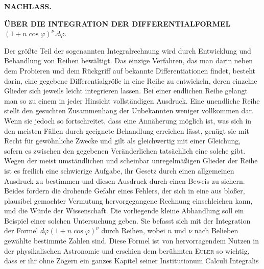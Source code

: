 
\begin{center}
\textbf{NACHLASS.}
\end{center}

\begin{center}
\textbf{ÜBER DIE INTEGRATION DER DIFFERENTIALFORMEL}\\
$(1+n\cos\varphi)^{\nu}. d\varphi.$
\end{center}

\noindent\hspace*{\parindent} Der größte Teil der sogenannten Integralrechnung wird durch Entwicklung und Behandlung von Reihen bewältigt. Das einzige Verfahren, das man darin neben dem Probieren und dem Rückgriff auf bekannte Differentiationen findet, besteht darin, eine gegebene Differentialgröße in eine Reihe zu entwickeln, deren einzelne Glieder sich jeweils leicht integrieren lassen. Bei einer endlichen Reihe gelangt man so zu einem in jeder Hinsicht vollständigen Ausdruck. Eine unendliche Reihe stellt den gesuchten Zusammenhang der Unbekannten weniger vollkommen dar. Wenn sie jedoch so fortschreitet, dass eine Annäherung möglich ist, was sich in den meisten Fällen durch geeignete Behandlung erreichen lässt, genügt sie mit Recht für gewöhnliche Zwecke und gilt als gleichwertig mit einer Gleichung, sofern es zwischen den gegebenen Veränderlichen tatsächlich eine solche gibt. Wegen der meist umständlichen und scheinbar unregelmäßigen Glieder der Reihe ist es freilich eine schwierige Aufgabe, ihr Gesetz durch einen allgemeinen Ausdruck zu bestimmen und diesen Ausdruck durch einen Beweis zu sichern. Beides fordern die drohende Gefahr eines Fehlers, der sich in eine aus bloßer, plausibel gemachter Vermutung hervorgegangene Rechnung einschleichen kann, und die Würde der Wissenschaft. Die vorliegende kleine Abhandlung soll ein Beispiel einer solchen Untersuchung geben. Sie befasst sich mit der Integration der Formel $d\varphi(1+n\cos\varphi)^{\nu}$ durch Reihen, wobei $n$ und $\nu$ nach Belieben gewählte bestimmte Zahlen sind. Diese Formel ist von hervorragendem Nutzen in der physikalischen Astronomie und erschien dem berühmten \textsc{Euler} so wichtig, dass er ihr ohne Zögern ein ganzes Kapitel seiner Institutionum Calculi Integralis%
